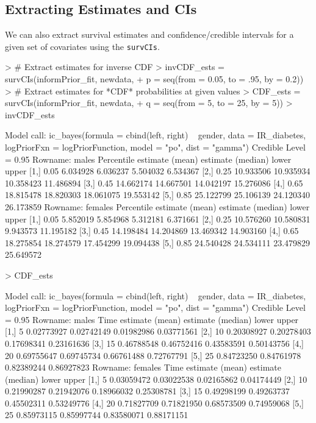 \documentclass[a4paper]{article}
\begin{document}
\subsection{Extracting Estimates and CIs}

We can also extract survival estimates and confidence/credible intervals
for a given set of covariates using the \texttt{survCIs}. 

\begin{Schunk}
\begin{Sinput}
> # Extract estimates for inverse CDF
> invCDF_ests = survCIs(informPrior_fit, newdata, 
+                       p = seq(from = 0.05, to = .95, by = 0.2))
> # Extract estimates for *CDF* probabilities at given values
> CDF_ests = survCIs(informPrior_fit, newdata, 
+                    q = seq(from = 5, to = 25, by = 5))
> invCDF_ests
\end{Sinput}
\begin{Soutput}
Model call:
  ic_bayes(formula = cbind(left, right) ~ gender, data = IR_diabetes, 
    logPriorFxn = logPriorFunction, model = "po", dist = "gamma")
Credible Level = 0.95 
Rowname:  males 
     Percentile estimate (mean) estimate (median)     lower     upper
[1,]       0.05        6.034928          6.036237  5.504032  6.534367
[2,]       0.25       10.933506         10.935934 10.358423 11.486894
[3,]       0.45       14.662174         14.667501 14.042197 15.276086
[4,]       0.65       18.815478         18.820303 18.061075 19.553142
[5,]       0.85       25.122799         25.106139 24.120340 26.173859
Rowname:  females 
     Percentile estimate (mean) estimate (median)     lower     upper
[1,]       0.05        5.852019          5.854968  5.312181  6.371661
[2,]       0.25       10.576260         10.580831  9.943573 11.195182
[3,]       0.45       14.198484         14.204869 13.469342 14.903160
[4,]       0.65       18.275854         18.274579 17.454299 19.094438
[5,]       0.85       24.540428         24.534111 23.479829 25.649572
\end{Soutput}
\begin{Sinput}
> CDF_ests
\end{Sinput}
\begin{Soutput}
Model call:
  ic_bayes(formula = cbind(left, right) ~ gender, data = IR_diabetes, 
    logPriorFxn = logPriorFunction, model = "po", dist = "gamma")
Credible Level = 0.95 
Rowname:  males 
     Time estimate (mean) estimate (median)      lower      upper
[1,]    5      0.02773927        0.02742149 0.01982986 0.03771561
[2,]   10      0.20308927        0.20278403 0.17698341 0.23161636
[3,]   15      0.46788548        0.46752416 0.43583591 0.50143756
[4,]   20      0.69755647        0.69745734 0.66761488 0.72767791
[5,]   25      0.84723250        0.84761978 0.82389244 0.86927823
Rowname:  females 
     Time estimate (mean) estimate (median)      lower      upper
[1,]    5      0.03059472        0.03022538 0.02165862 0.04174449
[2,]   10      0.21990287        0.21942076 0.18966032 0.25308781
[3,]   15      0.49298199        0.49263737 0.45502311 0.53249776
[4,]   20      0.71827709        0.71821950 0.68573509 0.74959068
[5,]   25      0.85973115        0.85997744 0.83580071 0.88171151
\end{Soutput}
\end{Schunk}
\end{document}
